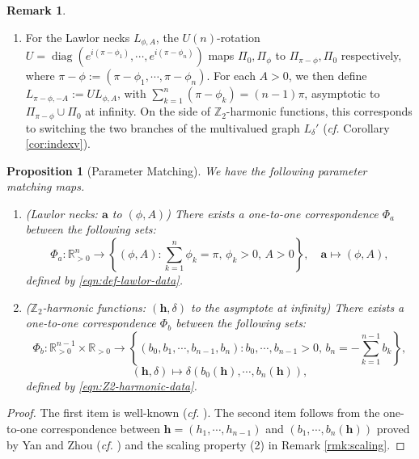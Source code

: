 \documentclass[11pt,a4paper]{article}
\numberwithin{equation}{section}%
\newtheorem{prop}[thm]{Proposition}
\theoremstyle{definition}
\newtheorem{rmk}[thm]{Remark}
\newcommand{\cf}{\emph{cf.} }
\newcommand{\R}{\mathbb{R}}
\newcommand{\bmh}{\boldsymbol{h}}
\newcommand{\bma}{\boldsymbol{a}}
\newcommand{\Z}{\mathbb{Z}}
\begin{document}
\begin{rmk}
\begin{enumerate}
        
        \item[\textnormal{(4)}] For the Lawlor necks $L_{\phi,A}$, the $U(n)$-rotation
            $U=\operatorname{diag}(e^{i(\pi-\phi_1)},\cdots,e^{i(\pi-\phi_n)})$
        maps $\Pi_0,\Pi_{\phi}$ to $\Pi_{\pi-\phi},\Pi_0$ respectively, where
        $\pi-\phi:=(\pi-\phi_1,\cdots,\pi-\phi_n)$.
        For each $A>0$, we then define
        $L_{\pi-\phi,-A}:=UL_{\phi,A}$,
        with $\sum\limits_{k=1}^n(\pi-\phi_k)=(n-1)\pi$, asymptotic to $\Pi_{\pi-\phi}\cup \Pi_0$ at infinity. On the side of $\Z_2$-harmonic functions, this corresponds to switching the two branches of the multivalued graph $L_{\delta}'$ (\cf Corollary \ref{cor:indexv}). 
    \end{enumerate}
\end{rmk}

\begin{prop}[Parameter Matching]
\label{prop: para-match}
    We have the following parameter matching maps.
\begin{enumerate}
    \item[\textnormal{(1)}] \textnormal{(Lawlor necks: $\bma$ to $(\phi,A)$)} There exists a one-to-one correspondence $\Phi_{a}$ between the following sets:
    \[
        \Phi_{a}:\R_{>0}^n
        \to
        \left\{
        (\phi,A):
        \sum_{k=1}^{n}\phi_k=\pi,\,
        \phi_k>0,\,
        A>0
        \right\},
        \quad
        \bma \mapsto (\phi,A),
    \]
    defined by \eqref{eqn:def-lawlor-data}.

    \item[\textnormal{(2)}] \textnormal{($\Z_2$-harmonic functions: $(\bmh,\delta)$ to the asymptote at infinity)}
    There exists a one-to-one correspondence $\Phi_{b}$ between the following sets:
    \[
        \Phi_{b}:
        \R^{n-1}_{>0}\times \R_{>0}
        \to
        \left\{
        (b_0,b_1,\cdots,b_{n-1},b_n):
        b_0,\cdots,b_{n-1}>0,\,
        b_n=-\sum_{k=1}^{n-1}b_k
        \right\},
    \]
    \[
        (\bmh,\delta)\mapsto \delta(b_0(\bmh),\cdots,b_n(\bmh)),
    \]
    defined by \eqref{eqn:Z2-harmonic-data}.
\end{enumerate}
\end{prop}
    \begin{proof}
        The first item is well-known (\cf \cite[Example 3.9]{IJS}). The second item follows from the one-to-one correspondence between $\bmh=(h_1,\cdots,h_{n-1})$ and $(b_1,\cdots,b_{n}(\bmh))$ proved by Yan and Zhou (\cf \cite[Corollary 4.3, Remark 4.4]{Yan-Construction}) and the scaling property (2) in Remark \ref{rmk:scaling}.  
    \end{proof}
\end{document}
